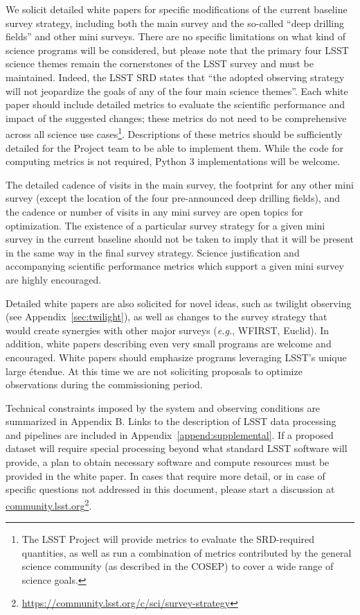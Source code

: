 \documentclass[DM,lsstdraft,toc,usenatbib]{lsstdoc}
\begin{document}
We solicit detailed white papers for specific modifications of the current baseline survey strategy, including 
both the main survey and the so-called ``deep drilling fields'' and other mini surveys. There are no 
specific limitations on what kind of science programs will be considered, but please note that 
the primary four LSST science themes remain the cornerstones of the LSST survey and must be
maintained. Indeed, the LSST SRD states that ``the adopted observing 
strategy will not jeopardize the goals of any of the four main science themes''. Each white paper should
include detailed metrics to evaluate the scientific performance and impact of the suggested changes; these metrics
do not need to be comprehensive across all science use cases\footnote{The LSST Project will provide metrics to evaluate
the SRD-required quantities, as well as run a combination of metrics contributed by the general science community
(as described in the COSEP) to cover a wide range of science goals.}. Descriptions of these metrics should be 
sufficiently detailed for the Project team
to be able to implement them. While the code for computing metrics is not required, Python 3 implementations
will be welcome. 

The detailed cadence of visits in the main survey, the footprint for any other mini survey (except the location of the four pre-announced
deep drilling fields), and the cadence or number of visits in any mini survey are open topics for optimization. The existence of a 
particular survey strategy for a given mini survey in the current baseline should not be taken to imply that it will be present in the same way in the final 
survey strategy. Science justification and accompanying scientific performance metrics which support a given mini survey are highly encouraged.

Detailed white papers are also solicited for novel ideas, such as twilight observing (see Appendix~\ref{sec:twilight}), 
as well as changes to the survey strategy that would create synergies with other major surveys ({\it e.g.}, WFIRST, Euclid). 
In addition, white papers describing even very small programs are welcome and encouraged. 
White papers should emphasize programs leveraging LSST's unique large \'{e}tendue.  
At this time we are not soliciting proposals to optimize observations during the commissioning period.

Technical constraints imposed by the system and observing conditions are summarized in 
Appendix B. Links to the description of LSST data processing and pipelines are included in Appendix~\ref{append:supplemental}.
If a proposed dataset will require special processing beyond what standard LSST software will provide, a plan to obtain necessary software and compute resources 
must be provided in the white paper. In cases that require more detail, or in case of specific questions not addressed in this 
document, please start a discussion at \href{http://community.lsst.org}{community.lsst.org}\footnote{\url{https://community.lsst.org/c/sci/survey-strategy}}.
\end{document}

